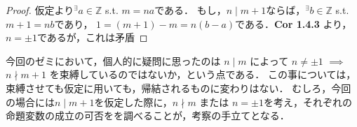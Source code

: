 \documentclass{jsarticle}
\begin{document}
    \begin{proof}
      仮定より$^{\exists}a \in \mathbb{Z}$ s.t. $m = na$である．
      もし，$n \mid m+1$ならば，$^{\exists}b \in \mathbb{Z}$ s.t. $m+1 = nb$であり，
      $1 = (m+1)-m = n(b-a)$である．\textbf{Cor 1.4.3} より，$n = \pm 1$であるが，これは矛盾
    \end{proof}

    今回のゼミにおいて，個人的に疑問に思ったのは $n \mid m$ によって $n \neq \pm 1$ $\implies$ $n \nmid m + 1$ を束縛しているのではないか，という点である．
    この事については，束縛させても仮定に用いても，帰結されるものに変わりはない．
    むしろ，今回の場合には$n \mid m+1$を仮定した際に，$n \nmid m$ または $n = \pm 1$を考え，それぞれの命題変数の成立の可否をを調べることが，考察の手立てとなる．
\end{document}
